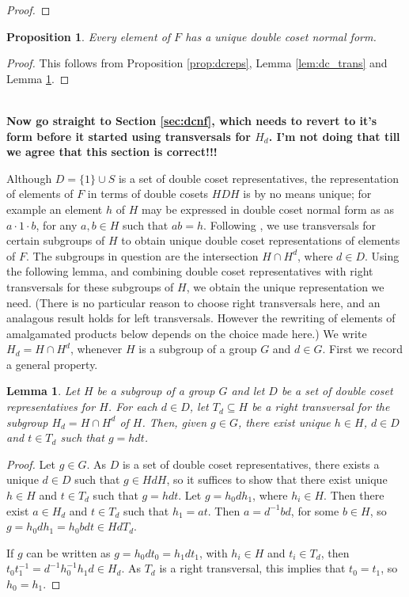 \documentclass[a4paper,12pt]{article}
\newtheorem{lemma}[theorem]{Lemma}
\newtheorem{proposition}[theorem]{Proposition}
\numberwithin{equation}{section}
\numberwithin{figure}{section}
\begin{document}
{\begin{proof}
\end{proof}
\begin{proposition}\label{prop:dctotrans}
Every element of $F$ has a unique double coset normal form. 
\end{proposition}
\begin{proof}
This follows from Proposition \ref{prop:dcreps}, Lemma \ref{lem:dc_trans} and Lemma \ref{lem:dcrel}.
\end{proof}
~\\[1em]
\textbf{\large Now go straight to Section \ref{sec:dcnf}, which needs to revert to it's form before
it started using transversals for $H_d$. I'm not doing that till we agree that this section is correct!!!}
~\\[1em]}

Although $D=\{1\}\cup S$ is a set of double coset representatives, the 
representation of elements of $F$ in terms of double cosets $HDH$ is by 
no means unique; for example an element $h$ of $H$ may be expressed in
double coset normal form as  
as $a\cdot 1 \cdot b$,  for any $a,b\in H$ such that $ab=h$.  
Following \cite{FrenkelRemeslennikov13}, we use transversals for certain subgroups of $H$ to 
obtain unique double coset representations of elements of $F$. The subgroups
in question are the intersection $H\cap H^d$, where $d\in D$. 
 Using the  following lemma, and combining double coset representatives
with right transversals for these subgroups of $H$, we obtain the unique
representation we need. (There is no particular reason to choose right 
transversals here, and an analagous result holds for left transversals. However
the rewriting of elements of amalgamated products below depends on the choice
made here.)    
We write  $H_d=H\cap H^d$, whenever $H$ is a subgroup of a group $G$ and
$d\in G$. 
First we record a general property.  
\begin{lemma}\label{lem:dcrel}
Let $H$ be a subgroup of a group $G$ and let $D$ be a set of
double coset representatives for $H$. For each $d\in D$, let 
$T_d\subseteq H$ be a right transversal for the subgroup $H_d=H\cap H^d$ of $H$.
Then, given $g\in G$, there exist  unique $h\in H$, $d\in D$ and 
$t\in T_d$ such that  $g=hdt$. 
\end{lemma}
\begin{proof}
Let $g\in G$. As $D$ is a set of double coset representatives, there
exists a unique $d\in D$ such that $g\in HdH$, so it suffices to
show that there exist unique $h\in H$ and $t\in T_d$ such that 
$g=hdt$. Let $g=h_0dh_1$, where $h_i\in H$. Then there exist $a\in H_d$ 
and   $t\in T_d$ such that $h_1=at$. Then $a=d^{-1}bd$, for some $b\in H$,
so $g=h_0dh_1=h_0bdt\in HdT_d$. 

If $g$ can be written as  $g=h_0dt_0=h_1dt_1$, with $h_i\in H$ and 
$t_i\in T_d$, then $t_0t_1^{-1}=d^{-1}h_0^{-1}h_1d\in H_d$. As 
$T_d$ is a right transversal, this implies that $t_0=t_1$, so $h_0=h_1$. 
\end{proof}
\end{document}
